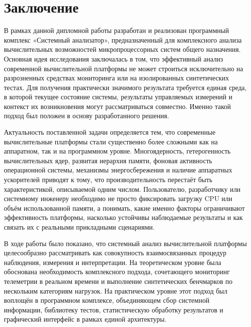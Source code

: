 \chapter*{Заключение}

В рамках данной дипломной работы разработан и реализован программный комплекс «Системный анализатор», предназначенный для комплексного анализа вычислительных возможностей микропроцессорных систем общего назначения. Основная идея исследования заключалась в том, что эффективный анализ современной вычислительной платформы не может строиться исключительно на разрозненных средствах мониторинга или на изолированных синтетических тестах. Для получения практически значимого результата требуется единая среда, в которой текущее состояние системы, результаты управляемых измерений и контекст их возникновения могут рассматриваться совместно. Именно такой подход был положен в основу разработанного решения.

Актуальность поставленной задачи определяется тем, что современные вычислительные платформы стали существенно более сложными как на аппаратном, так и на программном уровне. Многоядерность, гетерогенность вычислительных ядер, развитая иерархия памяти, фоновая активность операционной системы, механизмы энергосбережения и наличие аппаратных ускорителей приводят к тому, что производительность перестаёт быть характеристикой, описываемой одним числом. Пользователю, разработчику или системному инженеру необходимо не просто фиксировать загрузку CPU или объём использованной памяти, а понимать, какие именно факторы ограничивают эффективность платформы, насколько устойчивы наблюдаемые результаты и как связать их с реальными прикладными сценариями.

В ходе работы было показано, что системный анализ вычислительной платформы целесообразно рассматривать как совокупность взаимосвязанных процедур наблюдения, измерения и интерпретации. На теоретическом уровне была обоснована необходимость комплексного подхода, сочетающего мониторинг телеметрии в реальном времени и выполнение синтетических бенчмарков по нескольким категориям нагрузок. На практическом уровне этот подход был воплощён в программном комплексе, объединяющем сбор системной информации, библиотеку тестов, статистическую обработку результатов и графический интерфейс в рамках единой архитектуры.

